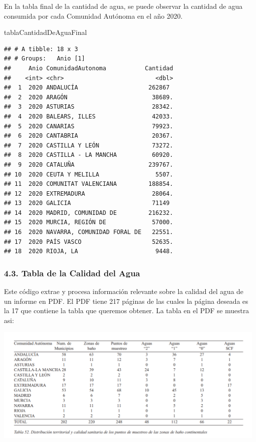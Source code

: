 \documentclass[
]{article}
\newenvironment{Shaded}{\begin{snugshade}}{\end{snugshade}}
\newcommand{\NormalTok}[1]{#1}
\begin{document}
En la tabla final de la cantidad de agua, se puede observar la cantidad
de agua consumida por cada Comunidad Autónoma en el año 2020.

\begin{Shaded}
\begin{Highlighting}[]
\NormalTok{tablaCantidadDeAguaFinal}
\end{Highlighting}
\end{Shaded}

\begin{verbatim}
## # A tibble: 18 x 3
## # Groups:   Anio [1]
##     Anio ComunidadAutonoma           Cantidad
##    <int> <chr>                          <dbl>
##  1  2020 ANDALUCÍA                    262867 
##  2  2020 ARAGÓN                        38689.
##  3  2020 ASTURIAS                      28342.
##  4  2020 BALEARS, ILLES                42033.
##  5  2020 CANARIAS                      79923.
##  6  2020 CANTABRIA                     20367.
##  7  2020 CASTILLA Y LEÓN               73272.
##  8  2020 CASTILLA - LA MANCHA          60920.
##  9  2020 CATALUÑA                     239767.
## 10  2020 CEUTA Y MELILLA                5507.
## 11  2020 COMUNITAT VALENCIANA         188854.
## 12  2020 EXTREMADURA                   28064.
## 13  2020 GALICIA                       71149 
## 14  2020 MADRID, COMUNIDAD DE         216232.
## 15  2020 MURCIA, REGIÓN DE             57000.
## 16  2020 NAVARRA, COMUNIDAD FORAL DE   22551.
## 17  2020 PAÍS VASCO                    52635.
## 18  2020 RIOJA, LA                      9448.
\end{verbatim}

\hypertarget{tabla-de-la-calidad-del-agua}{%
\subsubsection{4.3. Tabla de la Calidad del
Agua}\label{tabla-de-la-calidad-del-agua}}

Este código extrae y procesa información relevante sobre la calidad del
agua de un informe en PDF. El PDF tiene 217 páginas de las cuales la
página deseada es la 17 que contiene la tabla que queremos obtener. La
tabla en el PDF se muestra asi:

\includegraphics[width=6.25in,height=\textheight]{INPUT/images/imagenPDFTabla.png}
\end{document}
